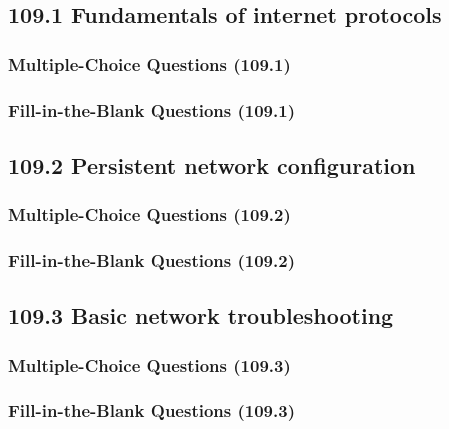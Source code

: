 \documentclass[a4paper]{report}
\begin{document}
\subsection*{109.1 Fundamentals of internet protocols}
\subsubsection*{Multiple-Choice Questions (109.1)}

\subsubsection*{Fill-in-the-Blank Questions (109.1)}

\subsection*{109.2 Persistent network configuration}
\subsubsection*{Multiple-Choice Questions (109.2)}

\subsubsection*{Fill-in-the-Blank Questions (109.2)}

\subsection*{109.3 Basic network troubleshooting}
\subsubsection*{Multiple-Choice Questions (109.3)}

\subsubsection*{Fill-in-the-Blank Questions (109.3)}

\end{document}
